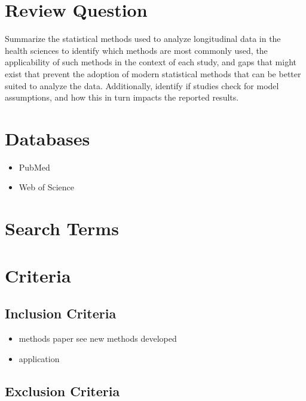 \documentclass[
]{article}
\providecommand{\tightlist}{%
  \setlength{\itemsep}{0pt}\setlength{\parskip}{0pt}}\usepackage{longtable,booktabs,array}
\begin{document}
\hypertarget{review-question}{%
\section{Review Question}\label{review-question}}

Summarize the statistical methods used to analyze longitudinal data in
the health sciences to identify which methods are most commonly used,
the applicability of such methods in the context of each study, and gaps
that might exist that prevent the adoption of modern statistical methods
that can be better suited to analyze the data. Additionally, identify if
studies check for model assumptions, and how this in turn impacts the
reported results.

\hypertarget{databases}{%
\section{Databases}\label{databases}}

\begin{itemize}
\tightlist
\item
  PubMed
\item
  Web of Science
\end{itemize}

\hypertarget{search-terms}{%
\section{Search Terms}\label{search-terms}}

\hypertarget{criteria}{%
\section{Criteria}\label{criteria}}

\hypertarget{inclusion-criteria}{%
\subsection{Inclusion Criteria}\label{inclusion-criteria}}

\begin{itemize}
\item
  methods paper see new methods developed
\item
  application
\end{itemize}

\hypertarget{exclusion-criteria}{%
\subsection{Exclusion Criteria}\label{exclusion-criteria}}
\end{document}
